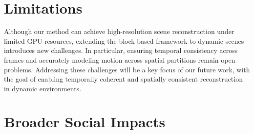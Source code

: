 \section{Limitations}


Although our method can achieve high-resolution scene reconstruction under limited GPU resources, extending the block-based framework to dynamic scenes introduces new challenges. In particular, ensuring temporal consistency across frames and accurately modeling motion across spatial partitions remain open problems. 
Addressing these challenges will be a key focus of our future work, with the goal of enabling temporally coherent and spatially consistent reconstruction in dynamic environments.




\section{Broader Social Impacts}
\label{sec:impact}



